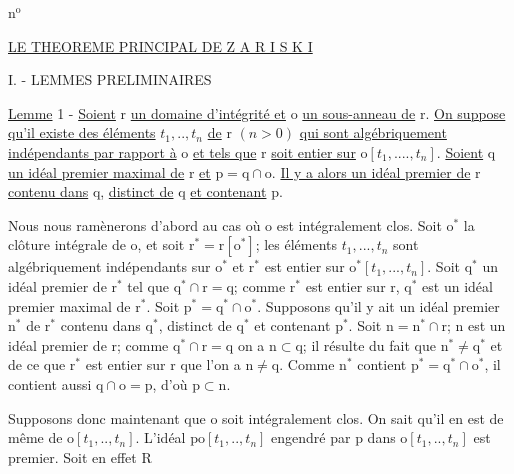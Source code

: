 
\hfill n$^{\mathrm{o}}$ 

\begin{center}
\uline{LE THEOREME PRINCIPAL DE Z A R I S K I}

I. - LEMMES PRELIMINAIRES
\end{center}

\uline{Lemme} 1 - \uline{Soient} $\mathrm r$ \uline{un domaine d'intégrité et} $\mathrm o$ \uline{un sous-anneau de} $\mathrm r$. \uline{On suppose qu'il existe des éléments} $t_1,..,t_n$ \uline{de} $\mathrm r$ $(n>0)$ \uline{qui sont algébriquement indépendants par rapport à} $\mathrm o$ \uline{et tels que} $\mathrm r$ \uline{soit entier sur} $\mathrm o[t_1,....,t_n]$. \uline{Soient} $\mathrm q$ \uline{un idéal premier maximal de} $\mathrm r$ \uline{et} $\mathrm p=\mathrm q\cap\mathrm o$. \uline{Il y a alors un idéal premier de} $\mathrm r$ \uline{contenu dans} $\mathrm q$, \uline{distinct de} $\mathrm q$ \uline{et contenant} $\mathrm p$.

Nous nous ramènerons d'abord au cas où $\mathrm o$ est intégralement clos. Soit $\mathrm o^*$ la clôture intégrale de $\mathrm o$, et soit $\mathrm r^*=\mathrm r[\mathrm o^*]$; les éléments $t_1,...,t_n$ sont algébriquement indépendants sur $\mathrm o^*$ et $\mathrm r^*$ est entier sur $\mathrm o^*[t_1,...,t_n]$. Soit $\mathrm q^*$ un idéal premier de $\mathrm r^*$ tel que $\mathrm q^*\cap\mathrm r=\mathrm q$; comme $\mathrm r^*$ est entier sur $\mathrm r$, $\mathrm q^*$ est un idéal premier maximal de $\mathrm r^*$. Soit $\mathrm p^*=\mathrm q^*\cap\mathrm o^*$. Supposons qu'il y ait un idéal premier $\mathrm n^*$ de $\mathrm r^*$ contenu dans $\mathrm q^*$, distinct de $\mathrm q^*$ et contenant $\mathrm p^*$. Soit $\mathrm n=\mathrm n^*\cap\mathrm r$; $\mathrm n$ est un idéal premier de $\mathrm r$; comme $\mathrm q^*\cap\mathrm r=\mathrm q$ on a $\mathrm n\subset\mathrm q$; il résulte du fait que $\mathrm n^*\ne\mathrm q^*$ et de ce que $\mathrm r^*$ est entier sur $\mathrm r$ que l'on a $\mathrm n\ne\mathrm q$. Comme $\mathrm n^*$ contient $\mathrm p^*=\mathrm q^*\cap\mathrm o^*$, il contient aussi $\mathrm q\cap\mathrm o=\mathrm p$, d'où $\mathrm p\subset\mathrm n$.

Supposons donc maintenant que $\mathrm o$ soit intégralement clos. On sait qu'il en est de même de $\mathrm o[t_1,..,t_n]$. L'idéal $\mathrm p\mathrm o[t_1,..,t_n]$ engendré par $\mathrm p$ dans $\mathrm o[t_1,..,t_n]$ est premier. Soit en effet $\mathrm R$


